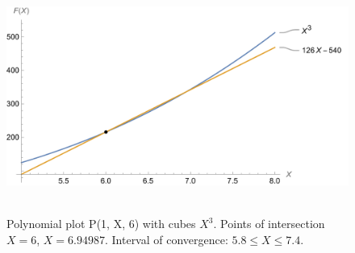 ﻿\begin{figure}[H]
    \centering
    \includegraphics[width=1\textwidth]{sections/images/01_plots_polynomial_p1_n6_with_cubes}
    ~\caption{Polynomial plot P(1, X, 6) with cubes $X^3$.
    Points of intersection $X=6$, $X=6.94987$.
    Interval of convergence: $5.8 \leq X \leq 7.4$.
    }\label{fig:figure7}
\end{figure}
